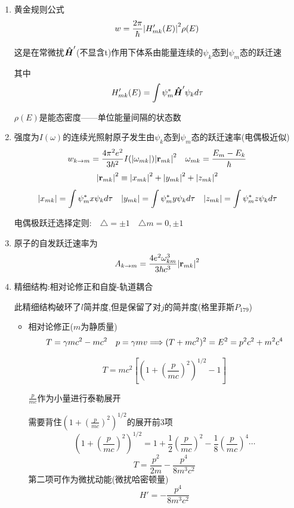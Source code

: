 \documentclass{article}
\begin{document}
\begin{formal}
\begin{enumerate}
                \item 黄金规则公式
                $$ w = \frac{2\pi}{\hbar}  \abs{H_{mk}'(E)}^{2} \rho(E) $$

                这是在常微扰$\vu*{H}'$(不显含t)作用下体系由能量连续的$\psi_{k}$态到$\psi_{m}$态的跃迁速

                其中
                $$ H_{mk}'(E) = \int \psi_{m}^{*} \vu*{H}' \psi_{k} d\tau $$

                $\rho(E)$是能态密度——单位能量间隔的状态数

                \item 强度为$I(\omega)$的连续光照射原子发生由$\psi_{k}$态到$\psi_{m}$态的跃迁速率(电偶极近似)
                $$ w_{k \rightarrow m} = \frac{4\pi^{2}e^{2}}{3\hbar^{2}} I(\abs{\omega_{mk}}) \abs{\vb{r}_{mk}}^{2} \quad \omega_{mk} = \dfrac{E_{m}-E_{k}}{\hbar} $$
                $$ \abs{\vb{r}_{mk}}^{2} \equiv \abs{x_{mk}}^{2} + \abs{y_{mk}}^{2} + \abs{z_{mk}}^{2} $$
                $$ \abs{x_{mk}} = \int \psi_{m}^{*}x\psi_{k} d\tau  \quad \abs{y_{mk}} = \int \psi_{m}^{*}y\psi_{k} d\tau \quad \abs{z_{mk}} = \int \psi_{m}^{*}z\psi_{k} d\tau $$
                
                电偶极跃迁选择定则:$ \quad \triangle = \pm 1 \quad \triangle m = 0,\pm 1 $

                \item 原子的自发跃迁速率为
                $$ A_{k \rightarrow m} = \frac{4e^{2}\omega_{km}^{3}}{3\hbar c^{3}} \abs{\vb{r}_{mk}}^{2} $$

                \item 精细结构:相对论修正和自旋-轨道耦合

                    此精细结构破环了$l$简并度,但是保留了对$j$的简并度(格里菲斯$P_{179}$)
                    \begin{itemize}
                        \item 相对论修正($m$为静质量)
                        $$ T = \gamma m c^{2} - m c^{2} \quad p = \gamma m v \Longrightarrow (T + mc^{2})^{2} = E^{2} = p^{2}c^{2} + m^{2}c^{4} $$
                        
                        $$ T = m c^{2} [ (1+(\frac{p}{m c})^{2})^{1/2} - 1] $$

                        $\frac{p}{mc}$作为小量进行泰勒展开

                        需要背住$(1+(\frac{p}{m c})^{2})^{1/2}$的展开前3项
                        $$ (1+(\frac{p}{m c})^{2})^{1/2} = 1 + \frac{1}{2} (\frac{p}{mc})^{2} - \frac{1}{8} (\frac{p}{mc})^{4} \cdots  $$
                        $$ T = \frac{p^{2}}{2m} - \frac{p^{4}}{8m^{3}c^{2}} $$
                        第二项可作为微扰动能(微扰哈密顿量)
                        $$ H' =  - \frac{p^{4}}{8m^{3}c^{2}} $$


\end{itemize}
\end{enumerate}
\end{formal}
\end{document}
